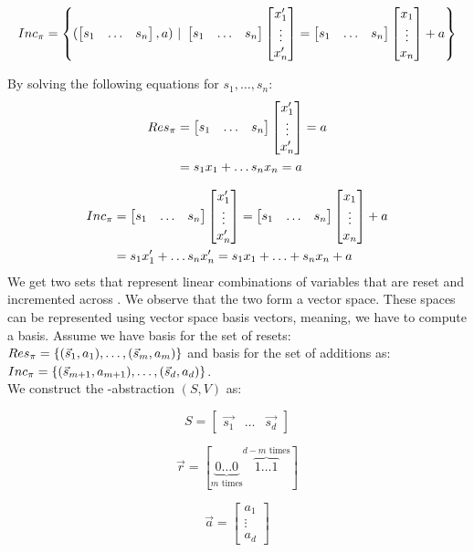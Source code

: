 \begin{equation*}
	Inc_\pi = \left\{(\begin{bmatrix} s_1 & \ldots &s_n \end{bmatrix}, a)\ |\ \begin{bmatrix} s_1 & \ldots &s_n \end{bmatrix} \begin{bmatrix} x_1' \\ \vdots \\ x_n' \end{bmatrix} = \begin{bmatrix} s_1 & \ldots &s_n \end{bmatrix} \begin{bmatrix} x_1 \\ \vdots \\ x_n \end{bmatrix} + a\right\}	
\end{equation*}
\begin{comment}
	\begin{equation*}
	Res_H = \left\{ (\s, a) | H \models \s \cdot \p = a \right\}	
	\end{equation*}
	
	\begin{equation*}
	Inc_H = \left\{(\s, a) | H \models \s \cdot \p = \s \cdot \up + a\right\}	
	\end{equation*}
\end{comment}
By solving the following equations for $s_1, \ldots, s_n$: \\
\begin{align*}
	Res_\pi &= \begin{bmatrix} s_1 & \ldots &s_n \end{bmatrix} \begin{bmatrix} x_1' \\ \vdots \\ x_n' \end{bmatrix} = a \\
 			&= s_1x_1 + \ldots s_nx_n = a
\end{align*}

\begin{align*}
	Inc_\trf &= \sn \pn = \sn \upn + a  \\ \vspace{0.5cm}
			 &= s_1x_1' + \ldots s_nx_n' = s_1x_1 + \ldots + s_nx_n + a
\end{align*}
We get two sets that represent linear combinations of variables that are reset and incremented across \trf. We observe that the two form a vector space. These spaces can be represented using vector space basis vectors, meaning, we have to compute a basis. Assume we have basis for the set of resets:
$Res_\pi = \{(\vec{s}_1, a_1), \ldots, (\vec{s}_m, a_m)\}$ and basis for the set of additions as: $Inc_\pi = \{(\vec{s}_{m+1}, a_{m+1}), \ldots, (\vec{s}_d, a_d)\}$. \\ We construct the \qvasr-abstraction $(S, V)$ as: \\
\begin{center}
\begin{minipage}{0.3\linewidth}
	\begin{equation*}
		S = \begin{bmatrix} \vec{s_1} & \ldots & \vec{s_d} \end{bmatrix}
	\end{equation*}
\end{minipage}
\begin{minipage}{0.3\linewidth}
	\begin{equation*}
		\vec{r} = [ \underbrace{0 \ldots 0}_{m\text{ times}} \overbrace{1 \ldots 1}^{d - m \text{ times}} ]
	\end{equation*}
\end{minipage}
\begin{minipage}{0.3\linewidth}
	\begin{equation*}
		\vec{a} = \begin{bmatrix} a_1 \\ \vdots \\ a_d \end{bmatrix}
	\end{equation*}
\end{minipage}
\end{center}

